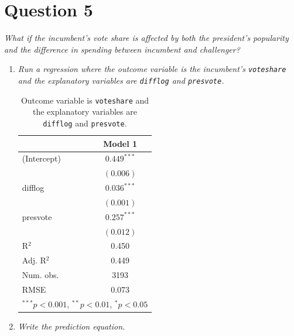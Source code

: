 \documentclass[12pt,letterpaper]{article}
\begin{document}
	\section*{Question 5}
	\noindent \emph{What if the incumbent's vote share is affected by both the president's popularity and the difference in spending between incumbent and challenger? }
	\begin{enumerate}
		\item \emph{Run a regression where the outcome variable is the incumbent's \texttt{voteshare} and the explanatory variables are \texttt{difflog} and \texttt{presvote}.}	\vspace{.25cm}
		
				  
				
					
				\begin{table}[h!]
					\begin{center}
						\caption{\footnotesize{Outcome variable is \texttt{voteshare} and the explanatory variables are  \texttt{difflog} and \texttt{presvote}.}} 
						
						\begin{tabular}{l c }
							\hline
							& Model 1 \\
							\hline		
						(Intercept) & $0.449^{***}$ \\
            & $(0.006)$     \\
difflog     & $0.036^{***}$ \\
            & $(0.001)$     \\
presvote    & $0.257^{***}$ \\
            & $(0.012)$     \\
\hline
R$^2$       & 0.450         \\
Adj. R$^2$  & 0.449         \\
Num. obs.   & 3193          \\
RMSE        & 0.073         \\
							\hline
							\multicolumn{2}{l}{\scriptsize{$^{***}p<0.001$, $^{**}p<0.01$, $^*p<0.05$}}
						\end{tabular}
						
					\end{center}
				\end{table}
				
				\vspace{.25cm}
		\item \emph{Write the prediction equation.}	\vspace{.25cm}
		

\end{enumerate}
\end{document}
